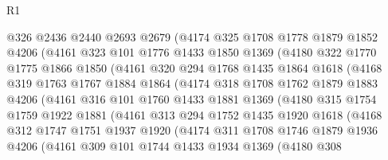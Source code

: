 \begin{lexlean}{R1}
\begin{coremodule}
            @326
            @2436
            @2440
            @2693
            @2679
            (@4174
              @325
              @1708
              @1778
              @1879
              @1852
              @4206
              (@4161
                @323
                @101
                @1776
                @1433
                @1850
                @1369
                (@4180
                  @322
                  @1770
                  @1775
                  @1866
                  @1850
                  (@4161
                    @320
                    @294
                    @1768
                    @1435
                    @1864
                    @1618
                    (@4168
                      @319
                      @1763
                      @1767
                      @1884
                      @1864
                      (@4174
                        @318
                        @1708
                        @1762
                        @1879
                        @1883
                        @4206
                        (@4161
                          @316
                          @101
                          @1760
                          @1433
                          @1881
                          @1369
                          (@4180
                            @315
                            @1754
                            @1759
                            @1922
                            @1881
                            (@4161
                              @313
                              @294
                              @1752
                              @1435
                              @1920
                              @1618
                              (@4168
                                @312
                                @1747
                                @1751
                                @1937
                                @1920
                                (@4174
                                  @311
                                  @1708
                                  @1746
                                  @1879
                                  @1936
                                  @4206
                                  (@4161
                                    @309
                                    @101
                                    @1744
                                    @1433
                                    @1934
                                    @1369
                                    (@4180
                                      @308

\end{coremodule}
\end{lexlean}
